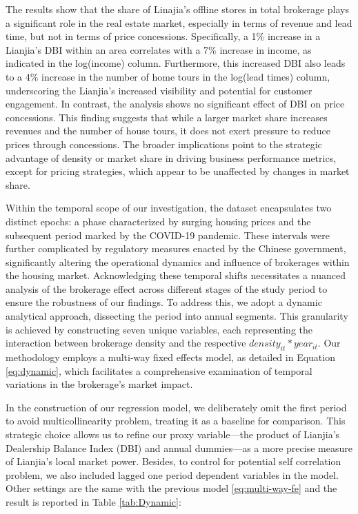 \documentclass[12pt]{article}
\begin{document}
The results show that the share of Linajia's offline stores in total brokerage plays a significant role in the real estate market, especially in terms of revenue and lead time, but not in terms of price concessions. Specifically, a 1\% increase in a Lianjia's DBI within an area correlates with a 7\% increase in income, as indicated in the log(income) column. Furthermore, this increased DBI also leads to a 4\% increase in the number of home tours in the log(lead times) column, underscoring the Lianjia's increased visibility and potential for customer engagement. In contrast, the analysis shows no significant effect of DBI on price concessions. This finding suggests that while a larger market share increases revenues and the number of house tours, it does not exert pressure to reduce prices through concessions. The broader implications point to the strategic advantage of density or market share in driving business performance metrics, except for pricing strategies, which appear to be unaffected by changes in market share.

Within the temporal scope of our investigation, the dataset encapsulates two distinct epochs: a phase characterized by surging housing prices and the subsequent period marked by the COVID-19 pandemic. These intervals were further complicated by regulatory measures enacted by the Chinese government, significantly altering the operational dynamics and influence of brokerages within the housing market. Acknowledging these temporal shifts necessitates a nuanced analysis of the brokerage effect across different stages of the study period to ensure the robustness of our findings. To address this, we adopt a dynamic analytical approach, dissecting the period into annual segments. This granularity is achieved by constructing seven unique variables, each representing the interaction between brokerage density and the respective $density_{it} * year_{it}$. Our methodology employs a multi-way fixed effects model, as detailed in Equation \eqref{eq:dynamic}, which facilitates a comprehensive examination of temporal variations in the brokerage's market impact.

In the construction of our regression model, we deliberately omit the first period to avoid multicollinearity problem, treating it as a baseline for comparison. This strategic choice allows us to refine our proxy variable—the product of Lianjia's Dealership Balance Index (DBI) and annual dummies—as a more precise measure of Lianjia's local market power. Besides, to control for potential self correlation problem, we also included lagged one period dependent variables in the model.  Other settings are the same with the previous model \eqref{eq:multi-way-fe} and the result is reported in Table \ref{tab:Dynamic}: 
\end{document}
